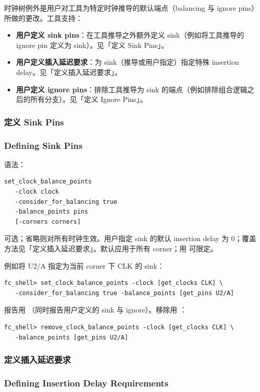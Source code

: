 时钟树例外是用户对工具为特定时钟推导的默认端点（balancing 与 ignore pins）所做的更改。工具支持：
\begin{itemize}
  \item \textbf{用户定义 sink pins}：在工具推导之外额外定义 sink（例如将工具推导的 ignore pin 定义为 sink）。见「定义 Sink Pins」。
  \item \textbf{用户定义插入延迟要求}：为 sink（推导或用户指定）指定特殊 insertion delay。见「定义插入延迟要求」。
  \item \textbf{用户定义 ignore pins}：排除工具推导为 sink 的端点（例如排除组合逻辑之后的所有分支）。见「定义 Ignore Pins」。
\end{itemize}

\subsubsection{定义 Sink Pins}
\subsubsection*{Defining Sink Pins}

语法：
\begin{lstlisting}
set_clock_balance_points
   -clock clock
   -consider_for_balancing true
   -balance_points pins
   [-corners corners]
\end{lstlisting}

 可选；省略则对所有时钟生效。用户指定 sink 的默认 insertion delay 为 0；覆盖方法见「定义插入延迟要求」。默认应用于所有 corner；用  可限定。

例如将 U2/A 指定为当前 corner 下 CLK 的 sink：
\begin{lstlisting}
fc_shell> set_clock_balance_points -clock [get_clocks CLK] \
   -consider_for_balancing true -balance_points [get_pins U2/A]
\end{lstlisting}

报告用 （同时报告用户定义的 sink 与 ignore）。移除用 ：
\begin{lstlisting}
fc_shell> remove_clock_balance_points -clock [get_clocks CLK] \
   -balance_points [get_pins U2/A]
\end{lstlisting}

\subsubsection{定义插入延迟要求}
\subsubsection*{Defining Insertion Delay Requirements}

